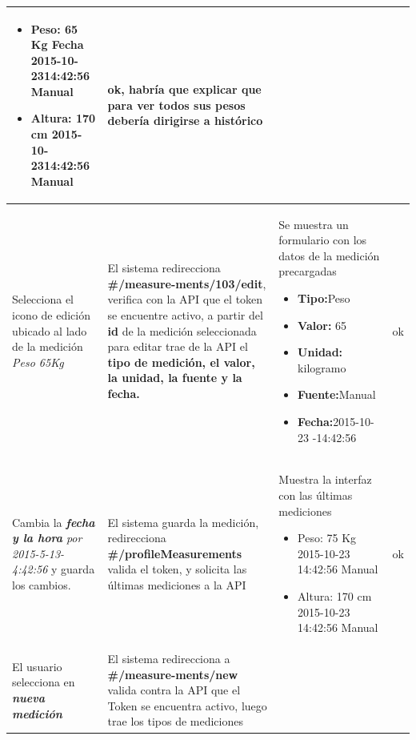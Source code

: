 \begin{longtable}{|p{4cm}|p{4cm}|p{4cm}|p{3cm}|}
\begin{itemize}
	\item Peso: 65 Kg Fecha 2015-10-2314:42:56 Manual
	\item Altura: 170 cm 2015-10-2314:42:56 Manual

\end{itemize}
& ok, habría que explicar que para ver todos sus pesos debería dirigirse a histórico

\\ \hline






Selecciona el icono de edición ubicado al lado de la medición \textit{Peso 65Kg}
& El sistema redirecciona \textbf{\#/measure-ments/103/edit}, verifica con la API que el token se encuentre activo, a partir del\textbf{ id} de la medición seleccionada para editar trae de la API el \textbf{tipo de medición, el valor, la unidad, la fuente y la fecha.}

& Se muestra un formulario con los datos de la medición precargadas
\begin{itemize}
	\item \textbf{Tipo:}Peso 
	\item \textbf{Valor: }65 
	\item \textbf{Unidad:} kilogramo
	\item \textbf{Fuente:}Manual 
	\item \textbf{Fecha:}2015-10-23 -14:42:56
\end{itemize}
&  ok
\\ \hline





Cambia la \textit{\textbf{fecha y la hora} por 2015-5-13- 4:42:56 }y guarda los cambios.
& El sistema guarda la medición, redirecciona\textbf{ \#/profileMeasurements }valida el token, y solicita las últimas mediciones a la API

& Muestra la interfaz con las últimas mediciones 
\begin{itemize}
	\item Peso: 75 Kg 2015-10-23 14:42:56 Manual 
	\item Altura: 170 cm 2015-10-23 14:42:56 Manual
\end{itemize}
& ok
\\ \hline





El usuario selecciona en \textit{\textbf{nueva medición}}
& El sistema redirecciona a \textbf{\#/measure-ments/new} valida contra la API que el Token se encuentra activo, luego trae los tipos de mediciones


\end{longtable}
